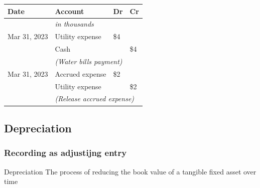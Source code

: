 \begin{tcolorbox}[colframe=black,colback=white,title=Example Adjusting Entry (Accrued Expense)]
    \vspace{1em}
    \begin{tabular}{llll}
        \textbf{Date} & \textbf{Account}                                       & \textbf{Dr} & \textbf{Cr} \\
        \hline
                      & \textit{in thousands}                                  &             &             \\
        Mar 31, 2023  & Utility expense                                        & \$4         &             \\
                      & \quad Cash                                             &             & \$4         \\
                      & \multicolumn{3}{l}{\textit{(Water bills payment)}}                                 \\
        Mar 31, 2023  & Accrued expense                                        & \$2         &             \\
                      & \quad Utility expense                                  &             & \$2         \\
                      & \multicolumn{3}{l}{\textit{(Release accrued expense)}}                             \\
    \end{tabular}
\end{tcolorbox}
\normalsize

\subsection{Depreciation}
\label{subsec:depreciation}

\subsubsection{Recording as adjustijng entry}

\begin{definition}
    {Depreciation}
    The process of reducing the book value of a tangible fixed asset over time
\end{definition}

